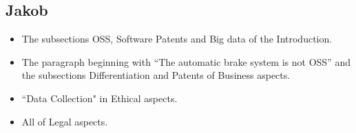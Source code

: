 \documentclass[conference]{IEEEtran}
\begin{document}
\subsection{Jakob}
\begin{itemize}
	\item
	The subsections OSS, Software Patents and Big data of the Introduction.
	\item
	The paragraph beginning with ``The automatic brake system is not OSS'' and the subsections Differentiation and Patents of Business aspects.
	\item
	``Data Collection" in Ethical aspects.
	\item
	All of Legal aspects.
\end{itemize}
\end{document}
